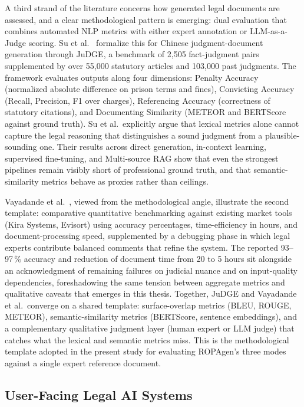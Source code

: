 \sloppy
A third strand of the literature concerns how generated legal documents are assessed, and a clear methodological pattern is emerging: dual evaluation that combines automated NLP metrics with either expert annotation or LLM-as-a-Judge scoring. Su et al.\ \cite{suJuDGEBenchmarkingJudgment2025} formalize this for Chinese judgment-document generation through JuDGE, a benchmark of 2,505 fact-judgment pairs supplemented by over 55,000 statutory articles and 103,000 past judgments. The framework evaluates outputs along four dimensions: Penalty Accuracy (normalized absolute difference on prison terms and fines), Convicting Accuracy (Recall, Precision, F1 over charges), Referencing Accuracy (correctness of statutory citations), and Documenting Similarity (METEOR and BERTScore against ground truth). Su et al.\ explicitly argue that lexical metrics alone cannot capture the legal reasoning that distinguishes a sound judgment from a plausible-sounding one. Their results across direct generation, in-context learning, supervised fine-tuning, and Multi-source RAG show that even the strongest pipelines remain visibly short of professional ground truth, and that semantic-similarity metrics behave as proxies rather than ceilings.

Vayadande et al.\ \cite{vayadandeAIPoweredLegalDocumentation2024}, viewed from the methodological angle, illustrate the second template: comparative quantitative benchmarking against existing market tools (Kira Systems, Evisort) using accuracy percentages, time-efficiency in hours, and document-processing speed, supplemented by a debugging phase in which legal experts contribute balanced comments that refine the system. The reported 93--97\,\% accuracy and reduction of document time from 20 to 5 hours sit alongside an acknowledgment of remaining failures on judicial nuance and on input-quality dependencies, foreshadowing the same tension between aggregate metrics and qualitative caveats that emerges in this thesis. Together, JuDGE and Vayadande et al.\ converge on a shared template: surface-overlap metrics (BLEU, ROUGE, METEOR), semantic-similarity metrics (BERTScore, sentence embeddings), and a complementary qualitative judgment layer (human expert or LLM judge) that catches what the lexical and semantic metrics miss. This is the methodological template adopted in the present study for evaluating ROPAgen's three modes against a single expert reference document.
\fussy

\subsection{User-Facing Legal AI Systems}

